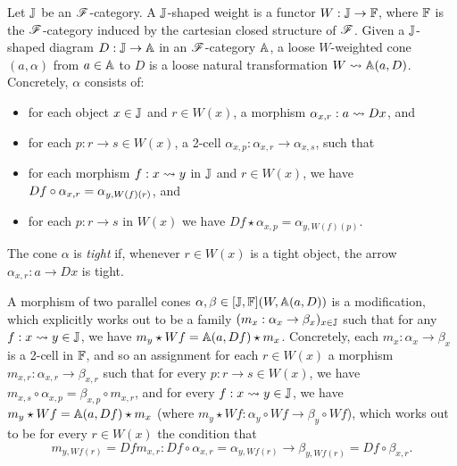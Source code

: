\documentclass[../thesis.tex]{subfiles}
\begin{document}
  \begin{definition}
    Let ${\mathbb{J}}$ be an ${\mathscr{F}}$-category. A ${\mathbb{J}}$-shaped weight is a functor $W : {\mathbb{J}} \to {\mathbb{F}}$, where ${\mathbb{F}}$
    is the ${\mathscr{F}}$-category induced by the cartesian closed structure of ${\mathscr{F}}$. Given a ${\mathbb{J}}$-shaped
    diagram $D : {\mathbb{J}} \to {\mathbb{A}}$ in an ${\mathscr{F}}$-category ${\mathbb{A}}$, a loose $W$-weighted cone $(a,\alpha)$
    from $a \in {\mathbb{A}}$ to $D$ is a loose natural transformation $W \rightsquigarrow {\mathbb{A}}(a,D)$. Concretely,
    $\alpha$ consists of:
    \begin{itemize}
      \item for each object $x \in {\mathbb{J}}$ and $r \in W(x)$, a morphism $\alpha_{x,r} : a \rightsquigarrow Dx$,
        and
      \item for each $p : r \to s \in W(x)$, a 2-cell $\alpha_{x,p} : \alpha_{x,r} \to \alpha_{x,s}$,
        such that
      \item for each morphism $f : x \rightsquigarrow y$ in ${\mathbb{J}}$ and $r \in W(x)$, we have $Df \circ \alpha_%
        {x,r} = \alpha_{y,W(f)(r)}$, and
      \item for each $p : r \to s$ in $W(x)$ we have $Df \star \alpha_{x,p} = \alpha_{y,W(f)(p)}$.
    \end{itemize} 
    The cone $\alpha$ is \emph{tight} if, whenever $r \in W(x)$ is a tight object, the arrow
    $\alpha_{x,r} : a \to Dx$ is tight.

    A morphism of two parallel cones $\alpha,\beta \in [{\mathbb{J}},{\mathbb{F}}](W,{\mathbb{A}}(a,D))$ is a modification,
    which explicitly works out to be a family $(m_x : \alpha_x \to \beta_x)_{x \in {\mathbb{J}}}$ such
    that for any $f : x \rightsquigarrow y \in {\mathbb{J}}$, we have $m_y \star Wf = {\mathbb{A}}(a,Df) \star m_x$. Concretely,
    each $m_x : \alpha_x \to \beta_x$ is a 2-cell in ${\mathbb{F}}$, and so an assignment for each
    $r \in W(x)$ a morphism $m_{x,r} : \alpha_{x,r} \to \beta_{x,r}$ such that for every $p :
    r \to s \in W(x)$, we have $m_{x,s} \circ \alpha_{x,p} = \beta_{x,p} \circ m_{x,r}$,
    and for every $f : x \rightsquigarrow y \in {\mathbb{J}}$, we have $m_y \star Wf = {\mathbb{A}}(a,Df) \star m_x$
    (where $m_y \star Wf : \alpha_y \circ Wf \to \beta_y \circ Wf$), which
    works out to be for every $r \in W(x)$ the condition that
    \[m_{y,Wf(r)} = Df m_{x,r} : Df \circ \alpha_{x,r} = \alpha_{y,Wf(r)} \to \beta_{y,Wf(r)}
    = Df \circ \beta_{x,r}.\]
  \end{definition}
\end{document}
